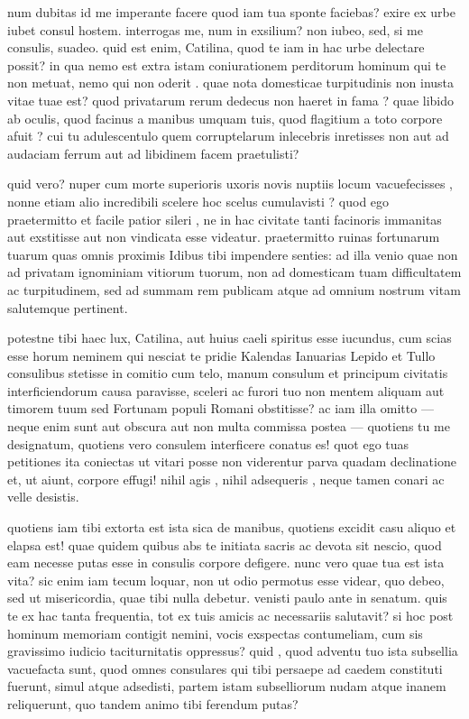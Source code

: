  num dubitas id me imperante facere quod iam tua sponte faciebas? exire ex urbe iubet consul hostem. interrogas me, num in exsilium? non iubeo, sed, si me consulis, suadeo. quid est enim, Catilina, quod te iam in hac urbe delectare possit? in qua nemo est extra istam coniurationem perditorum hominum qui te non metuat, nemo qui non oderit . quae nota domesticae turpitudinis non inusta vitae tuae est? quod privatarum rerum dedecus non haeret in fama ? quae libido ab oculis, quod facinus a manibus umquam tuis, quod flagitium a toto corpore afuit ? cui tu adulescentulo quem corruptelarum inlecebris inretisses non aut ad audaciam ferrum aut ad libidinem facem praetulisti?

 quid vero? nuper cum morte superioris uxoris novis nuptiis locum vacuefecisses , nonne etiam alio incredibili scelere hoc scelus cumulavisti ? quod ego praetermitto et facile patior sileri , ne in hac civitate tanti facinoris immanitas aut exstitisse aut non vindicata esse videatur. praetermitto ruinas fortunarum tuarum quas omnis proximis Idibus tibi impendere senties: ad illa venio quae non ad privatam ignominiam vitiorum tuorum, non ad domesticam tuam difficultatem ac turpitudinem, sed ad summam rem publicam atque ad omnium nostrum vitam salutemque pertinent.

 potestne tibi haec lux, Catilina, aut huius caeli spiritus esse iucundus, cum scias esse horum neminem qui nesciat te pridie Kalendas Ianuarias Lepido et Tullo consulibus stetisse in comitio cum telo, manum consulum et principum civitatis interficiendorum causa paravisse, sceleri ac furori tuo non mentem aliquam aut timorem tuum sed Fortunam populi Romani obstitisse? ac iam illa omitto — neque enim sunt aut obscura aut non multa commissa postea — quotiens tu me designatum, quotiens vero consulem interficere conatus es! quot ego tuas petitiones ita coniectas ut vitari posse non viderentur parva quadam declinatione et, ut aiunt, corpore effugi! nihil agis , nihil adsequeris , neque tamen conari ac velle desistis.

 quotiens iam tibi extorta est ista sica de manibus, quotiens excidit casu aliquo et elapsa est! quae quidem quibus abs te initiata sacris ac devota sit nescio, quod eam necesse putas esse in consulis corpore defigere. nunc vero quae tua est ista vita? sic enim iam tecum loquar, non ut odio permotus esse videar, quo debeo, sed ut misericordia, quae tibi nulla debetur. venisti paulo ante in senatum. quis te ex hac tanta frequentia, tot ex tuis amicis ac necessariis salutavit? si hoc post hominum memoriam contigit nemini, vocis exspectas contumeliam, cum sis gravissimo iudicio taciturnitatis oppressus? quid , quod adventu tuo ista subsellia vacuefacta sunt, quod omnes consulares qui tibi persaepe ad caedem constituti fuerunt, simul atque adsedisti, partem istam subselliorum nudam atque inanem reliquerunt, quo tandem animo tibi ferendum putas?

